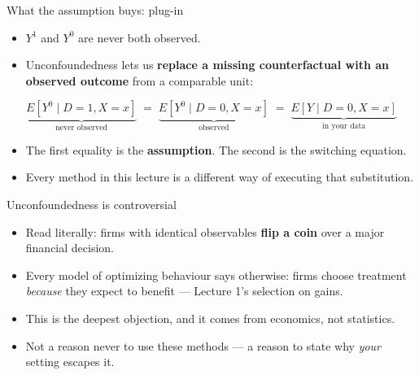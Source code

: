 \documentclass[
  11pt,
  ignorenonframetext,
  aspectratio=169,
]{beamer}
\providecommand{\tightlist}{%
  \setlength{\itemsep}{0pt}\setlength{\parskip}{0pt}}
\begin{document}
\begin{frame}{What the assumption buys: plug-in}
\protect{}\label{what-the-assumption-buys-plug-in}
\begin{itemize}
\tightlist
\item
  \(Y^1\) and \(Y^0\) are never both observed.
\item
  Unconfoundedness lets us \textbf{replace a missing counterfactual with
  an observed outcome} from a comparable unit:
\end{itemize}

\[
\underbrace{E[Y^0 \mid D{=}1, X{=}x]}_{\text{never observed}}
\;=\;
\underbrace{E[Y^0 \mid D{=}0, X{=}x]}_{\text{observed}}
\;=\;
\underbrace{E[Y \mid D{=}0, X{=}x]}_{\text{in your data}}
\]

\begin{itemize}
\tightlist
\item
  The first equality is the \textbf{assumption}. The second is the
  switching equation.
\item
  Every method in this lecture is a different way of executing that
  substitution.
\end{itemize}
\end{frame}

\begin{frame}{Unconfoundedness is controversial}
\protect{}\label{unconfoundedness-is-controversial}
\begin{itemize}
\tightlist
\item
  Read literally: firms with identical observables \textbf{flip a coin}
  over a major financial decision.
\item
  Every model of optimizing behaviour says otherwise: firms choose
  treatment \emph{because} they expect to benefit --- Lecture 1's
  selection on gains.
\item
  This is the deepest objection, and it comes from economics, not
  statistics.
\item
  Not a reason never to use these methods --- a reason to state why
  \emph{your} setting escapes it.
\end{itemize}
\end{frame}
\end{document}
